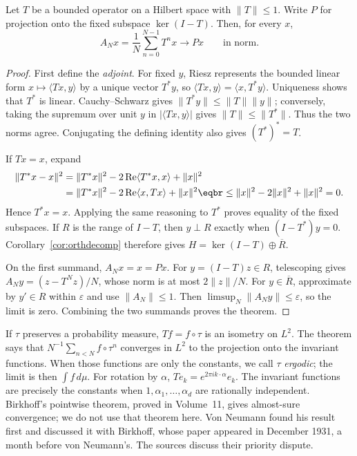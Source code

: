 \begin{theorem}\label{thm:meanergodic}
Let $T$ be a bounded operator on a Hilbert space with $\|T\|\le1$. Write $P$ for projection onto the fixed subspace $\ker(I-T)$. Then, for every $x$,
\[A_Nx=\frac1N\sum_{n=0}^{N-1}T^nx\longrightarrow Px\qquad\text{in norm}.\]
\end{theorem}
\begin{proof}
First define the \emph{adjoint}. For fixed $y$, Riesz represents the bounded linear form $x\mapsto\langle Tx,y\rangle$ by a unique vector $T^*y$, so $\langle Tx,y\rangle=\langle x,T^*y\rangle$. Uniqueness shows that $T^*$ is linear. Cauchy--Schwarz gives $\|T^*y\|\le\|T\|\|y\|$; conversely, taking the supremum over unit $y$ in $|\langle Tx,y\rangle|$ gives $\|T\|\le\|T^*\|$. Thus the two norms agree. Conjugating the defining identity also gives $(T^*)^*=T$.

If $Tx=x$, expand
\[\begin{aligned}
\|T^*x-x\|^2&=\|T^*x\|^2-2\operatorname{Re}\langle T^*x,x\rangle+\|x\|^2\\
&=\|T^*x\|^2-2\operatorname{Re}\langle x,Tx\rangle+\|x\|^2\eqbr
\le\|x\|^2-2\|x\|^2+\|x\|^2=0.
\end{aligned}\]
Hence $T^*x=x$. Applying the same reasoning to $T^*$ proves equality of the fixed subspaces. If $R$ is the range of $I-T$, then $y\perp R$ exactly when $(I-T^*)y=0$. Corollary~\ref{cor:orthdecomp} therefore gives $H=\ker(I-T)\oplus\overline R$.

On the first summand, $A_Nx=x=Px$. For $y=(I-T)z\in R$, telescoping gives $A_Ny=(z-T^Nz)/N$, whose norm is at most $2\|z\|/N$. For $y\in\overline R$, approximate by $y'\in R$ within $\varepsilon$ and use $\|A_N\|\le1$. Then $\limsup_N\|A_Ny\|\le\varepsilon$, so the limit is zero. Combining the two summands proves the theorem.
\end{proof}

If $\tau$ preserves a probability measure, $Tf=f\circ\tau$ is an isometry on $L^2$. The theorem says that $N^{-1}\sum_{n<N}f\circ\tau^n$ converges in $L^2$ to the projection onto the invariant functions. When those functions are only the constants, we call $\tau$ \emph{ergodic}; the limit is then $\int f\,d\mu$. For rotation by $\alpha$, $Te_k=e^{2\pi ik\cdot\alpha}e_k$. The invariant functions are precisely the constants when $1,\alpha_1,\dots,\alpha_d$ are rationally independent. Birkhoff's pointwise theorem, proved in Volume~11, gives almost-sure convergence; we do not use that theorem here. Von Neumann found his result first and discussed it with Birkhoff, whose paper appeared in December 1931, a month before von Neumann's. The sources discuss their priority dispute.

